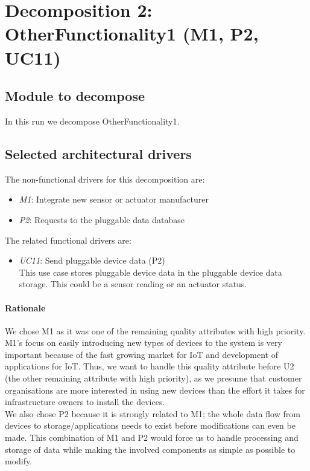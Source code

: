 \section{Decomposition 2: OtherFunctionality1 (M1, P2, UC11)}

\subsection{Module to decompose}
    In this run we decompose OtherFunctionality1.


\subsection{Selected architectural drivers}
    The non-functional drivers for this decomposition are:
    \begin{itemize}
    	\item \emph{M1}: Integrate new sensor or actuator manufacturer
        \item \emph{P2}: Requests to the pluggable data database
    \end{itemize}

    \noindent The related functional drivers are:
    \begin{itemize}
        \item \emph{UC11}: Send pluggable device data (P2) \\
              This use case stores pluggable device data in the pluggable device data storage.
              This could be a sensor reading or an actuator status.
    \end{itemize}

    \paragraph{Rationale}
    We chose M1 as it was one of the remaining quality attributes with high priority.
    M1's focus on easily introducing new types of devices to the system is very important
    because of the fast growing market for IoT and development of applications for IoT.
    Thus, we want to handle this quality attribute before U2 (the other remaining
    attribute with high priority), as we presume that customer organisations
    are more interested in using new devices than the effort it takes for
    infrastructure owners to install the devices. \\
    We also chose P2 because it is strongly related to M1; the whole data flow from
    devices to storage/applications needs to exist before modifications can even be made.
    This combination of M1 and P2 would force us to handle processing and
    storage of data while making the involved components as simple as possible to modify.


